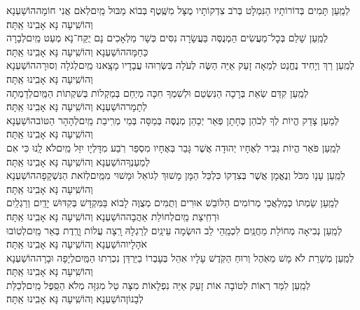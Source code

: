 \documentclass[twoside, openany, parskip=half, 11pt]{book}
\begin{document}
\begin{small}
	לְמַֽעַן תָּמִים בְּדוֹרוֹתָיו הַנִּמְלָט בְּרֹב צִדְקוֹתָיו\hfill\break
	מֻצָּל מִשֶּֽׁטֶף בְּבוֹא מַבּוּל מַֽיִם\hfill\break לְאֹם אֲנִי חוֹמָה\hfill הוֹשַׁעְנָא וְהוֹשִֽׁיעָה נָּא אָבִֽינוּ אַֽתָּה׃\\
	לְמַֽעַן שָׁלֵם בְּכׇל־מַעֲשִׂים הַמְנֻסֶּה בַּעֲשָׂרָה נִסִּים\hfill\break
	כְּשָׁר מַלְאָכִים נָם יֻקַּח־נָא מְעַט מַֽיִם\hfill\break לְבָרָה כַּחַמָּה\hfill הוֹשַׁעְנָא וְהוֹשִֽׁיעָה נָּא אָבִֽינוּ אַֽתָּה׃\\
	לְמַֽעַן רַךְ וְיָחִיד נֶחֱנַט לְמֵאָה זָעַק אַיֵּה הַשֶּׂה לְעֹלָה\hfill\break
	בִּשְּׂרֽוּהוּ עֲבָדָיו מָצָֽאנוּ מַֽיִם\hfill\break לְגֹלָה וְסוּרָה\hfill הוֹשַׁעְנָא וְהוֹשִֽׁיעָה נָּא אָבִֽינוּ אַֽתָּה׃\\
	לְמַֽעַן קִדַּם שְׂאֵת בְּרָכָה הַנִּשְׂטַם וּלְשִׁמְךָ חִכָּה\hfill\break
	מְיַחֵם בְּמַקְלוֹת בְּשִׁקְתוֹת הַמַּֽיִם\hfill\break לְדָמְתָה לְתָמָר\hfill הוֹשַׁעְנָא וְהוֹשִֽׁיעָה נָּא אָבִֽינוּ אַֽתָּה׃\\
	לְמַעַן צָדַק הֱיוֹת לְךָ לְכֹהֵן כֶּחָתָן פְּאֵר יְכַהֵן\hfill\break
	מְנֻסֶּה בְּמַסָּה בְּמֵי מְרִֽיבַת מַֽיִם\hfill\break לְהָהָר הַטּוֹב\hfill הוֹשַׁעְנָא וְהוֹשִֽׁיעָה נָּא אָבִֽינוּ אַֽתָּה׃\\
	לְמַֽעַן פֹּאַר הֱיוֹת גְּבִיר לְאֶחָיו יְהוּדָה אֲשֶׁר גָּבַר בְּאֶחָיו\hfill\break
	מִסְפַּר רֹֽבַע מִדָּלְיָו יִזַּל מַֽיִם\hfill\break לֹא לָֽנוּ כִּי אִם לְמַעַנְךָ\hfill הוֹשַׁעְנָא וְהוֹשִֽׁיעָה נָּא אָבִֽינוּ אַֽתָּה׃\\
	לְמַֽעַן עָנָו מִכֹּל וְנֶאֱמָן אֲשֶׁר בְּצִדְקוֹ כִּלְכֵּל הַמָּן\hfill\break
	מָשׁוּךְ לְגוֹאֵל וּמָשׁוּי מִמַּֽיִם\hfill\break לְזֹאת הַנִּשְׁקָפָה\hfill הוֹשַׁעְנָא וְהוֹשִֽׁיעָה נָּא אָבִֽינוּ אַֽתָּה׃\\
	לְמַֽעַן שַׂמְתּוֹ כְּמַלְאֲכֵי מְרוֹמִים הַלּוֹבֵשׁ אוּרִים וְתֻמִּים\hfill\break
	מְצֻוֶּה לָבוֹא בַּמִּקְדָּשׁ בְּקִדּוּשׁ יָדַֽיִם וְרַגְלַֽיִם וּרְחִֽיצַת מַֽיִם\hfill\break לְחוֹלַת אַהֲבָה\hfill הוֹשַׁעְנָא וְהוֹשִֽׁיעָה נָּא אָבִֽינוּ אַֽתָּה׃\\
	לְמַֽעַן נְבִיאָה מְחוֹלַת מַחֲנַֽיִם לִכְמֵֽהֵי לֵב הוּשְׂמָה עֵינַֽיִם\hfill\break
	לְרַגְלָהּ רָֽצָה עֲלוֹת וָרֶֽדֶת בְּאֵר מַֽיִם\hfill\break לְטֽוֹבוּ אֹהָלָיו\hfill הוֹשַׁעְנָא וְהוֹשִֽׁיעָה נָּא אָבִֽינוּ אַֽתָּה׃\\
	לְמַֽעַן מְשָׁרֵת לֹא מָשׁ מֵאֹֽהֶל וְרוּחַ הַקֹּֽדֶשׁ עָלָיו אִהֵל\hfill\break
	בְּעָבְרוֹ בַיַּרְדֵּן נִכְרְתוּ הַמַּֽיִם\hfill\break לְיָפָה וּבָרָה\hfill הוֹשַׁעְנָא וְהוֹשִֽׁיעָה נָּא אָבִֽינוּ אַֽתָּה׃\\
	לְמַֽעַן לִמַּד רְאוֹת לְטוֹבָה אוֹת זָעַק אַיֵּה נִפְלָאוֹת\hfill\break
	מִצָּה טַל מִגִּזָּה מְלֹא הַסֵּֽפֶל מַֽיִם\hfill\break לְכַלַּת לְבָנוֹן\hfill הוֹשַׁעְנָא וְהוֹשִֽׁיעָה נָּא אָבִֽינוּ אַֽתָּה׃\\

\end{small}
\end{document}

